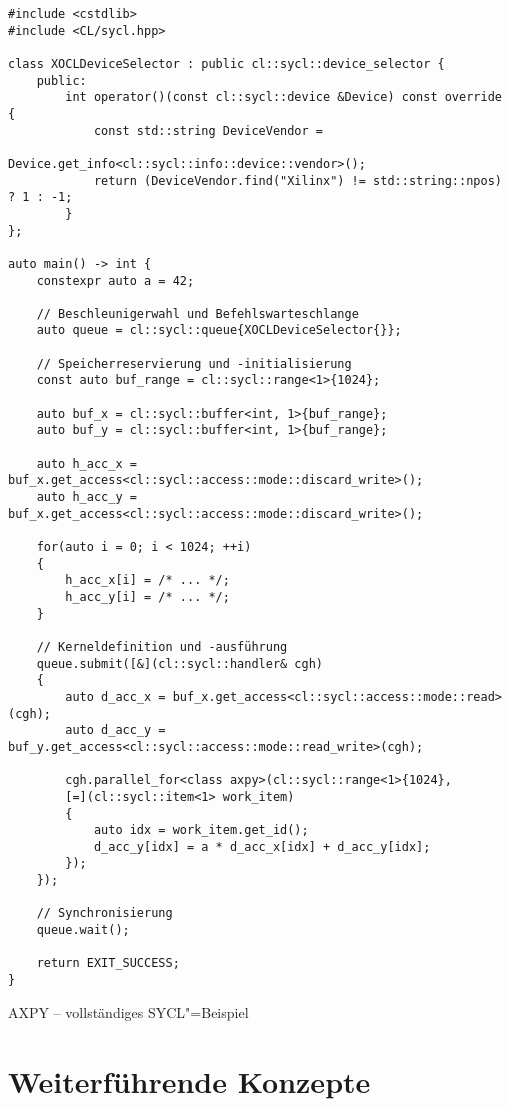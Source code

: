 \begin{code}
    \begin{verbatim}
#include <cstdlib>
#include <CL/sycl.hpp>

class XOCLDeviceSelector : public cl::sycl::device_selector {
    public:
        int operator()(const cl::sycl::device &Device) const override {
            const std::string DeviceVendor =
                            Device.get_info<cl::sycl::info::device::vendor>();
            return (DeviceVendor.find("Xilinx") != std::string::npos) ? 1 : -1;
        }
};

auto main() -> int {
    constexpr auto a = 42;

    // Beschleunigerwahl und Befehlswarteschlange
    auto queue = cl::sycl::queue{XOCLDeviceSelector{}};

    // Speicherreservierung und -initialisierung
    const auto buf_range = cl::sycl::range<1>{1024};

    auto buf_x = cl::sycl::buffer<int, 1>{buf_range};
    auto buf_y = cl::sycl::buffer<int, 1>{buf_range};

    auto h_acc_x = buf_x.get_access<cl::sycl::access::mode::discard_write>();
    auto h_acc_y = buf_x.get_access<cl::sycl::access::mode::discard_write>();

    for(auto i = 0; i < 1024; ++i)
    {
        h_acc_x[i] = /* ... */;
        h_acc_y[i] = /* ... */;
    }

    // Kerneldefinition und -ausführung
    queue.submit([&](cl::sycl::handler& cgh)
    {
        auto d_acc_x = buf_x.get_access<cl::sycl::access::mode::read>(cgh);
        auto d_acc_y = buf_y.get_access<cl::sycl::access::mode::read_write>(cgh);

        cgh.parallel_for<class axpy>(cl::sycl::range<1>{1024},
        [=](cl::sycl::item<1> work_item)
        {
            auto idx = work_item.get_id();
            d_acc_y[idx] = a * d_acc_x[idx] + d_acc_y[idx];
        });
    });

    // Synchronisierung
    queue.wait();

    return EXIT_SUCCESS;
}
    \end{verbatim}
    \caption{AXPY -- vollständiges SYCL"=Beispiel}
    \label{sycl:ueberblick:saxpy:zusammenfassung:code}
\end{code}

\section{Weiterführende Konzepte}\label{sycl:konzepte}

